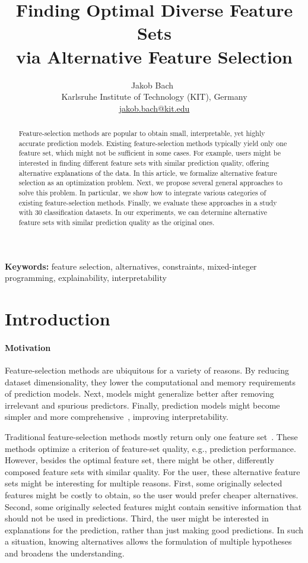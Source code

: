 \documentclass{article}
\title{
	Finding Optimal Diverse Feature Sets\\
	via Alternative Feature Selection
}
\author{
	Jakob Bach~\orcidlink{0000-0003-0301-2798}\\
	\small Karlsruhe Institute of Technology (KIT), Germany\\
	\small \href{mailto:jakob.bach@kit.edu}{jakob.bach@kit.edu}
}
\date{} %
\theoremstyle{definition}
\begin{document}
\maketitle

\begin{abstract}
Feature-selection methods are popular to obtain small, interpretable, yet highly accurate prediction models.
Existing feature-selection methods typically yield only one feature set, which might not be sufficient in some cases.
For example, users might be interested in finding different feature sets with similar prediction quality, offering alternative explanations of the data.
In this article, we formalize alternative feature selection as an optimization problem.
Next, we propose several general approaches to solve this problem.
In particular, we show how to integrate various categories of existing feature-selection methods.
Finally, we evaluate these approaches in a study with 30 classification datasets.
In our experiments, we can determine alternative feature sets with similar prediction quality as the original ones.
\end{abstract}
%
\textbf{Keywords:} feature selection, alternatives, constraints, mixed-integer programming, explainability, interpretability

\section{Introduction}
\label{sec:introduction}

\paragraph{Motivation}

Feature-selection methods are ubiquitous for a variety of reasons.
By reducing dataset dimensionality, they lower the computational and memory requirements of prediction models.
Next, models might generalize better after removing irrelevant and spurious predictors.
Finally, prediction models might become simpler and more comprehensive~\cite{li2017feature}, improving interpretability.

Traditional feature-selection methods mostly return only one feature set~\cite{borboudakis2021extending}.
These methods optimize a criterion of feature-set quality, e.g., prediction performance.
However, besides the optimal feature set, there might be other, differently composed feature sets with similar quality.
For the user, these alternative feature sets might be interesting for multiple reasons.
First, some originally selected features might be costly to obtain, so the user would prefer cheaper alternatives.
Second, some originally selected features might contain sensitive information that should not be used in predictions.
Third, the user might be interested in explanations for the prediction, rather than just making good predictions.
In such a situation, knowing alternatives allows the formulation of multiple hypotheses and broadens the understanding.
\end{document}
